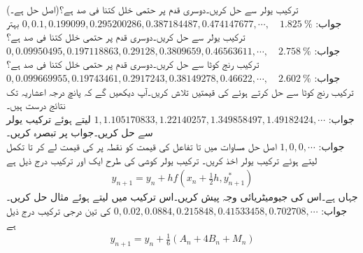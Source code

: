 \quad
ترکیب یولر سے  حل کریں۔دوسری قدم پر حتمی خلل کتنا فی صد ہے؟(اصل حل  ہے۔)\\
جواب:\quad
$0,0.1,0.199099,0.295200286,0.387184487,0.474147677,\cdots, \quad \SI{1.825}{\percent}$
\quad
بہتر ترکیب یولر سے  حل کریں۔دوسری قدم پر حتمی خلل کتنا فی صد ہے؟\\
جواب:\quad
$0,0.09950495,0.197118863,0.29128,0.3809659,0.46563611,\cdots,\quad \SI{2.758}{\percent}$
\quad
ترکیب رنج کوٹا  سے  حل کریں۔دوسری قدم پر حتمی خلل کتنا فی صد ہے؟\\
جواب:\quad
$0,0.099669955,0.19743461,0.2917243,0.38149278,0.46622,\cdots,\quad \SI{2.602}{\percent}$
\quad
ترکیب رنج کوٹا  سے  حل کرتے ہوئے  کی قیمتیں تلاش کریں۔آپ دیکھیں گے کہ پانچ درجہ اعشاریہ تک نتائج درست ہیں۔\\
جواب:\quad
$1,1.105170833,1.22140257,1.349858497,1.49182424,\cdots$
\quad
{} لیتے ہوئے ترکیب یولر سے  حل کریں۔جواب پر تبصرہ کریں۔\\
جواب:\quad
$1,0,0,\cdots$
اصل حل 
\quad
مساوات  میں  تا  تفاعل  کی قیمت کو نقطہ  پر  کی قیمت لے کر  تا  تکمل لیتے ہوئے ترکیب یولر اخذ کریں۔
\quad
ترکیب یولر کوشی کی طرح ایک اور ترکیب درج ذیل ہے
\begin{align*}
y_{n+1}=y_n+hf(x_n+\tfrac{1}{2}h,y^*_{n+1})
\end{align*}
جہاں  ہے۔اس کی جیومیٹریائی وجہ پیش کریں۔اس ترکیب میں  لیتے ہوئے مثال  حل کریں۔\\
جواب:\quad
$0,0.02,0.0884,0.215848,0.41533458,0.702708,\cdots$
\quad
{} کی تین درجی ترکیب درج ذیل ہے
\begin{align*}
y_{n+1}=y_n+\tfrac{1}{6}(A_n+4B_n+M_n)
\end{align*}
